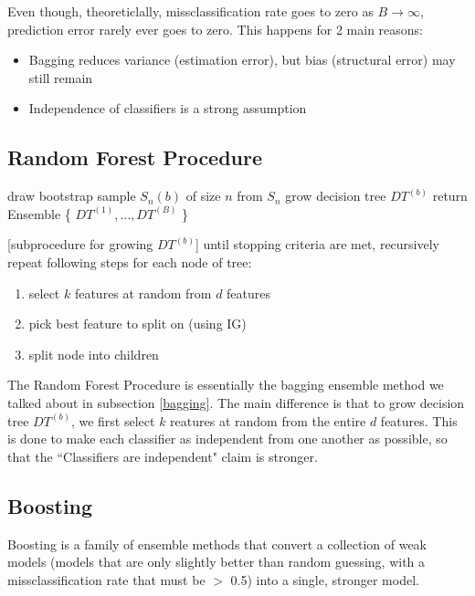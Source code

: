 \documentclass[12pt]{article}
\begin{document}
Even though, theoreticlally, missclassification rate goes to zero as $B \rightarrow \infty$, prediction error rarely ever goes to zero. This happens for 2 main reasons:

\begin{itemize}
	\item	Bagging reduces variance (estimation error), but bias (structural error) may still remain
	\item Independence of classifiers is a strong assumption
\end{itemize}

\subsection{Random Forest Procedure}

\begin{algorithm} \label{Random Forest Procedure}
\caption{Random Forest Procedure}
\begin{algorithmic}
        \State draw bootstrap sample $S_n(b)$ of size $n$ from $S_n$
				\State grow decision tree $DT^{(b)}$
    \EndFor
		\State return Ensemble \{ $DT^{(1)}, \dots, DT^{(B)}$ \}
\end{algorithmic}
\end{algorithm}

[subprocedure for growing $DT^{(b)}$]
until stopping criteria are met, recursively repeat following steps for each node of tree:
\begin{enumerate}
	\item select $k$ features at random from $d$ features
	\item pick best feature to split on (using IG)
	\item split node into children
\end{enumerate}

The Random Forest Procedure is essentially the bagging ensemble method we talked about in subsection \ref{bagging}. The main difference is that to grow decision tree $DT^{(b)}$, we first select $k$ reatures at random from the entire $d$ features. This is done to make each classifier as independent from one another as possible, so that the ``Classifiers are independent" claim is stronger.

\subsection{Boosting}

Boosting is a family of ensemble methods that convert a collection of weak models (models that are only slightly better than random guessing, with a missclassification rate that must be $>$ 0.5) into a single, stronger model.
\end{document}
